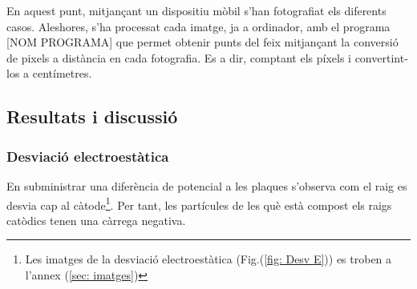 \documentclass[11pt]{article}
\numberwithin{equation}{section}
\numberwithin{figure}{section}
\numberwithin{table}{section}
\begin{document}
En aquest punt, mitjançant un dispositiu mòbil s'han fotografiat els diferents casos. Aleshores, s'ha processat cada imatge, ja a ordinador, amb el programa [NOM PROGRAMA] que permet obtenir punts del feix mitjançant la conversió de pixels a distància en cada fotografia. Es a dir, comptant els píxels i convertint-los a centímetres. 




\newpage
\subsection{Resultats i discussió}

\subsubsection{Desviació electroestàtica}\label{sec: desv_electr}

En subministrar una diferència de potencial a les plaques s'observa com el raig es desvia cap al càtode\footnote{Les imatges de la desviació electroestàtica (Fig.(\ref{fig: Desv E})) es troben a l'annex (\ref{sec: imatges}) }. Per tant, les partícules de les què està compost els raigs catòdics tenen una càrrega negativa.
\end{document}
